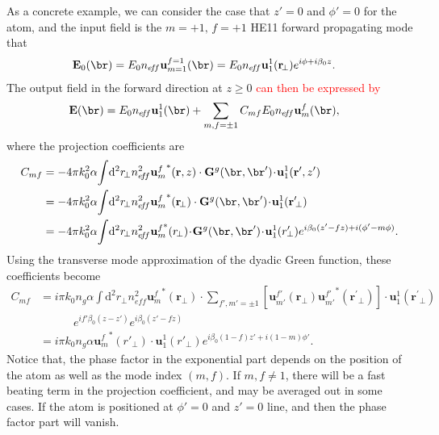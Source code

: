 \documentclass[]{report}
\begin{document}
As a concrete example, we can consider the case that $ z'=0 $ and $ \phi'=0 $ for the atom, and the input field is the $ m=+1,\,f=+1 $ HE11 forward propagating mode that
\begin{align}
\mathbf{E}_0(\br) &= E_0n_{e\!f\!f} \mathbf{u}_{m=1}^{f=1} (\br) = E_0n_{e\!f\!f} \mathbf{u}_1^1 (\mathbf{r}\!_\perp)e^{i\phi+i\beta_0 z}. 
\end{align}
The output field in the forward direction at $ z\ge 0 $ \textcolor{red}{can then be expressed by}
\begin{align}
\mathbf{E}(\br) &= E_0n_{e\!f\!f}\mathbf{u}_{1}^{1} (\br) + \sum_{m,f=\pm 1} C_{mf} E_0n_{e\!f\!f} \mathbf{u}_m^f(\br),  
\end{align}
where the projection coefficients are 
\begin{align}
C_{mf} &= -4\pi k_0^2 \alpha \!\int\! \mathrm{d}^2r\!_\perp n^2_{e\!f\!f} {\mathbf{u}^f_m}^*(\mathbf{r},z)\cdot \mathbf{G}^g(\br,\br') \!\cdot\! \mathbf{u}_1^1(\mathbf{r}^\prime,z')\\
&= -4\pi k_0^2 \alpha \!\int\! \mathrm{d}^2r\!_\perp n^2_{e\!f\!f} {\mathbf{u}^f_m}^*(\mathbf{r}\!_\perp)\cdot \mathbf{G}^g(\br,\br') \!\cdot\! \mathbf{u}_1^1(\mathbf{r}^\prime\!_\perp)\\
&= -4\pi k_0^2 \alpha \!\int\! \mathrm{d}^2r\!_\perp n^2_{e\!f\!f} {\mathbf{u}^f_m}^{\!\!*}(r\!_\perp)\!\cdot\! \mathbf{G}^g(\br,\br') \!\cdot\! \mathbf{u}_1^1(r^\prime\!\!_\perp)e^{i\beta_0(z'-fz)+i(\phi'-m\phi)}.
\end{align}
Using the transverse mode approximation of the dyadic Green function, these coefficients become
\begin{align}
C_{mf} &= i\pi k_0 n_g\alpha \!\int\! \mathrm{d}^2r\!_\perp n^2_{e\!f\!f} {\mathbf{u}^f_m}^*(\mathbf{r}\!_\perp)\cdot\!\!\!\!\!\! \sum_{f',m'=\pm 1}\!\!\!\! \left[\mathbf{u}_{m'}^{f'}(\mathbf{r}\!_\perp){\mathbf{u}^{f'}_{m'}}^*(\mathbf{r}^\prime\!_\perp) \right]\!\cdot\! \mathbf{u}_1^1(\mathbf{r}^\prime\!_\perp)\nonumber\\
&\quad\quad\quad e^{if'\beta_0(z-z')} e^{i\beta_0(z'-fz)}\\
&= i\pi k_0 n_g\alpha  {\mathbf{u}^f_m}^*(r'_{\!\perp})\cdot \mathbf{u}_1^1(r'_{\!\perp})e^{i\beta_0 (1-f)z'+i(1-m)\phi'}.
\end{align}
Notice that, the phase factor in the exponential part depends on the position of the atom as well as the mode index $ (m,f) $. If $ m,f\neq 1 $, there will be a fast beating term in the projection coefficient, and may be averaged out in some cases. If the atom is positioned at $ \phi'=0 $ and $ z'=0 $ line, and then the phase factor part will vanish. 
\end{document}
